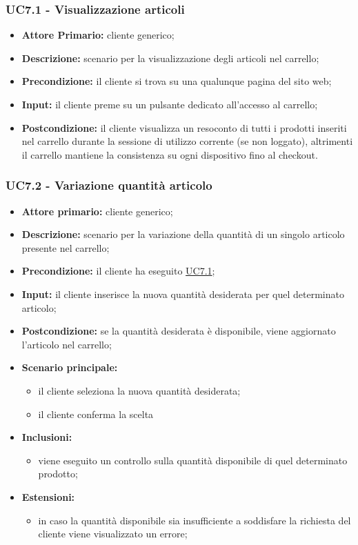 \subsubsection{UC7.1 - Visualizzazione articoli}
\label{UC7.1}
\begin{itemize}
    \item \textbf{Attore Primario:} cliente generico;
    \item \textbf{Descrizione:} scenario per la visualizzazione degli articoli nel carrello;
    \item \textbf{Precondizione:} il cliente si trova su una qualunque pagina del sito web;
    \item \textbf{Input:} il cliente preme su un pulsante dedicato all'accesso al carrello;
    \item \textbf{Postcondizione:} il cliente visualizza un resoconto di tutti i prodotti inseriti nel carrello durante
                                   la sessione di utilizzo corrente (se non loggato), altrimenti il carrello mantiene la consistenza
                                   su ogni dispositivo fino al checkout.
\end{itemize}

\subsubsection{UC7.2 - Variazione quantità articolo}
\label{UC7.2}
\begin{itemize}
    \item \textbf{Attore primario:} cliente generico;
    \item \textbf{Descrizione:} scenario per la variazione della quantità di un singolo articolo presente nel carrello;
    \item \textbf{Precondizione:} il cliente ha eseguito \hyperref[UC7.1]{UC7.1};
    \item \textbf{Input:} il cliente inserisce la nuova quantità desiderata per quel determinato articolo;
    \item \textbf{Postcondizione:} se la quantità desiderata è disponibile, viene aggiornato l'articolo nel carrello;
    \item \textbf{Scenario principale:}
    \begin{itemize}
        \item il cliente seleziona la nuova quantità desiderata;
        \item il cliente conferma la scelta
    \end{itemize}
    \item \textbf{Inclusioni:}
    \begin{itemize}
        \item viene eseguito un controllo sulla quantità disponibile di quel determinato prodotto;
    \end{itemize}
    \item \textbf{Estensioni:}
    \begin{itemize}
        \item in caso la quantità disponibile sia insufficiente a soddisfare la richiesta del cliente viene visualizzato un errore;
    \end{itemize}
\end{itemize}

